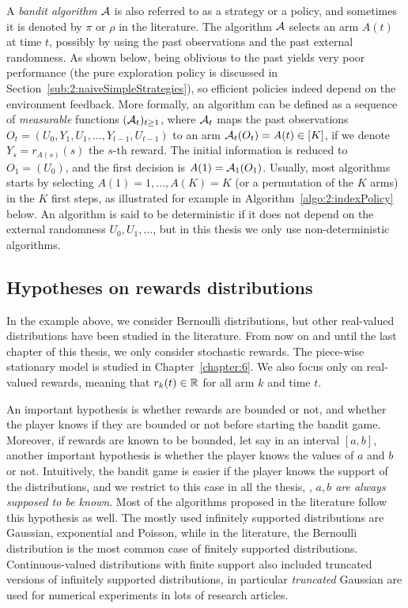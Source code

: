 A \emph{bandit algorithm} $\mathcal{A}$ is also referred to as a strategy or a policy, and sometimes it is denoted by $\pi$ or $\rho$ in the literature.
The algorithm $\mathcal{A}$ selects an arm $A(t)$ at time $t$, possibly by using the past observations and the past external randomness.
As shown below, being oblivious to the past yields very poor performance (the pure exploration policy is discussed in Section~\ref{sub:2:naiveSimpleStrategies}), so efficient policies indeed depend on the environment feedback.
%
More formally, an algorithm can be defined as a sequence of \emph{measurable} functions $(\mathcal{A}_t)_{t\geq1}$,
where $\mathcal{A}_t$ maps the past observations $O_t = (U_0, Y_1, U_1, \dots, Y_{t-1}, U_{t-1})$
to an arm $\mathcal{A}_t(O_t) = A(t) \in[K]$,
if we denote $Y_s = r_{A(s)}(s)$ the $s$-th reward.
The initial information is reduced to $O_1 = (U_0)$, and the first decision is $A(1) = \mathcal{A}_1(O_1)$. Usually, most algorithms starts by selecting $A(1)=1,\dots,A(K)=K$ (or a permutation of the $K$ arms) in the $K$ first steps, as illustrated for example in Algorithm~\ref{algo:2:indexPolicy} below.
%
An algorithm is said to be deterministic if it does not depend on the external randomness $U_0,U_1,\dots$, but in this thesis we only use non-deterministic algorithms.


\subsection{Hypotheses on rewards distributions}

In the example above, we consider Bernoulli distributions, but other real-valued distributions have been studied in the literature.
From now on and until the last chapter of this thesis, we only consider stochastic rewards. The piece-wise stationary model is studied in Chapter~\ref{chapter:6}.
%
We also focus only on real-valued rewards, meaning that $r_k(t)\in\mathbb{R}$ for all arm $k$ and time $t$.

An important hypothesis is whether rewards are bounded or not,
and whether the player knows if they are bounded or not before starting the bandit game.
Moreover, if rewards are known to be bounded, let say in an interval $[a,b]$, another important hypothesis is whether the player knows the values of $a$ and $b$ or not.
%
Intuitively, the bandit game is easier if the player knows the support of the distributions, and we restrict to this case in all the thesis, \ie, \emph{$a,b$ are always supposed to be known}.
Most of the algorithms proposed in the literature follow this hypothesis as well.
%
The mostly used
infinitely supported distributions are Gaussian, exponential and Poisson,
while in the literature, the Bernoulli distribution is the most common case of finitely supported distributions.
Continuous-valued distributions with finite support also included truncated versions of infinitely supported distributions, in particular \emph{truncated} Gaussian are used for numerical experiments in lots of research articles.

